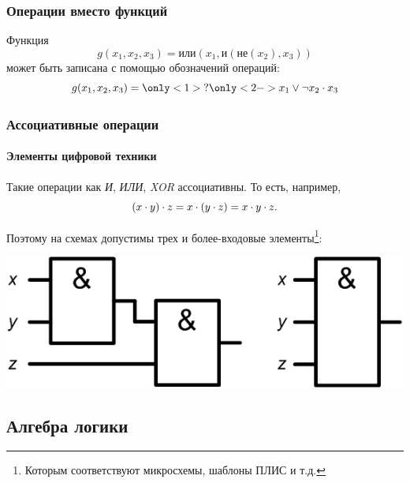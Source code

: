\begin{frame}
    \frametitle{Операции вместо функций}
    
    \begin{example}
        Функция 
        \[
            g(x_1,x_2,x_3)=\textit{или}(x_1,\textit{и}(\textit{не}(x_2), x_3))
        \]
        может быть записана с помощью обозначений операций:
        \[
            g(x_1,x_2,x_3) = \only<1>{?}\only<2->{x_1 \lor \lnot x_2 \MyLand x_3}
        \]
    \end{example}
    
    \begin{center}
    \end{center}
\end{frame}

\begin{frame}
    \frametitle{Ассоциативные операции}
    \framesubtitle{Элементы цифровой техники}

    Такие операции как \textit{И}, \textit{ИЛИ}, \textit{XOR} ассоциативны. То есть, например,
    \[
        (x\cdot y)\cdot z = x\cdot (y\cdot z) = x\cdot y\cdot z.
    \]
    
    Поэтому на схемах допустимы трех и более-входовые элементы\footnote{Которым соответствуют микросхемы, шаблоны ПЛИС и т.д.}:
    \begin{center}
        \includegraphics[width=.6\textwidth]{fig/tripleAnd}
    \end{center}
\end{frame}

\subsection{Алгебра логики}

